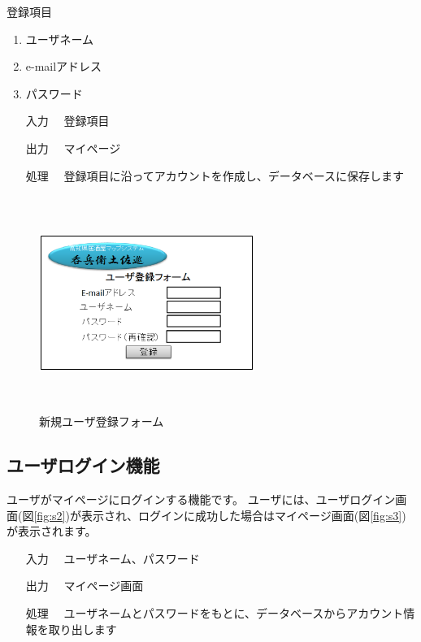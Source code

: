 \documentclass[a4j,titlepage]{jarticle}
\begin{document}
登録項目
\begin{enumerate}
  \item ユーザネーム
  \item e-mailアドレス
  \item パスワード
\end{enumerate}

\begin{enumerate}
  \item [入力]　登録項目
  \item [出力]　マイページ
  \item [処理]　登録項目に沿ってアカウントを作成し、データベースに保存します
\end{enumerate}

\begin{figure}[htbp]
  \begin{center}
  \includegraphics [height=7cm, width=7cm]{extrnal1_design_document_image/s1.eps}
  \caption{新規ユーザ登録フォーム}
  \label {fig:s1}
  \end{center}
\end{figure}

\newpage
\subsection{ユーザログイン機能}
ユーザがマイページにログインする機能です。
ユーザには、ユーザログイン画面(図\ref{fig:s2})が表示され、ログインに成功した場合はマイページ画面(図\ref{fig:s3})が表示されます。

\begin{enumerate}
  \item [入力]　ユーザネーム、パスワード
  \item [出力]　マイページ画面
  \item [処理]　ユーザネームとパスワードをもとに、データベースからアカウント情報を取り出します
\end{enumerate}
\end{document}
